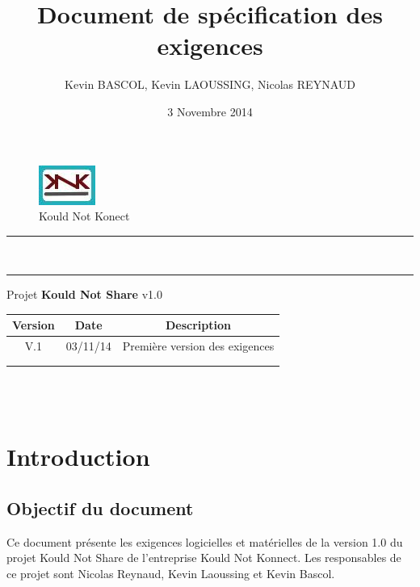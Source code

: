 \documentclass[10pt,a4paper]{report}
\author{Kevin BASCOL, Kevin LAOUSSING, Nicolas REYNAUD}
\title{Document de spécification des exigences}
\date{3 Novembre 2014}
\begin{document}
\makeatletter
	\begin{titlepage}
	
	\begin{figure}
		\begin{minipage}[c]{.46\linewidth}
		\end{minipage} \hfill
		\begin{minipage}[c]{.20\linewidth}
			\begin{center}
				\includegraphics{../Logo/logoKNK.jpg}\\
				{\large Kould Not Konect}
			\end{center}
		\end{minipage}
	\vspace{1cm}
	\end{figure}
	
	\centering
		{
		\hrule height 2pt
		\vspace{0.7cm}
		\Huge \textbf{\@title}}\\
		\vspace{0.7cm}
		\hrule height 2pt
		\vspace{1.5cm}
		{\LARGE  Projet \textbf{Kould Not Share} v1.0}
		
		\vfill
		
		\begin{tabular}{|c|c|c|}
			\hline
			Version & Date & Description\\
			\hline
			V.1 & 03/11/14 & Première version des exigences\\
			\hline
			 & & \\
			\hline
			 & & \\
			\hline
		\end{tabular}\\
		\vspace{1cm}
		\@author\\
		\end{titlepage}
\makeatother
\setcounter{secnumdepth}{5}
\setcounter{tocdepth}{5}
\renewcommand{\contentsname}{Sommaire}
\tableofcontents
\thispagestyle{empty}
\setcounter{page}{0}
\newpage


\section{Introduction}

\subsection{Objectif du document}
Ce document présente les exigences logicielles et matérielles de la version 1.0 du projet Kould Not Share de l'entreprise Kould Not Konnect. Les responsables de ce projet sont Nicolas Reynaud, Kevin Laoussing et Kevin Bascol.
\end{document}
